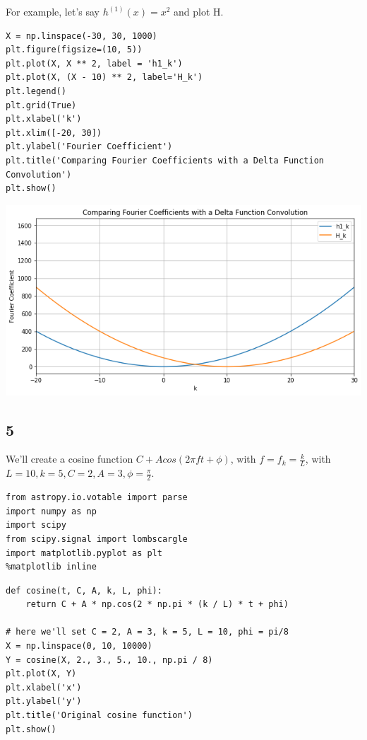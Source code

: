 \documentclass[11pt]{article}
\begin{document}
For example, let's say $h^{(1)}(x) = x^2$ and plot H.

\begin{verbatim}
X = np.linspace(-30, 30, 1000)
plt.figure(figsize=(10, 5))
plt.plot(X, X ** 2, label = 'h1_k')
plt.plot(X, (X - 10) ** 2, label='H_k')
plt.legend()
plt.grid(True)
plt.xlabel('k')
plt.xlim([-20, 30])
plt.ylabel('Fourier Coefficient')
plt.title('Comparing Fourier Coefficients with a Delta Function Convolution')
plt.show()
\end{verbatim}

\includegraphics[width=.9\linewidth]{./obipy-resources/17087KBx.png}


\subsection*{5}
\label{sec-1-5}

We'll create a cosine function $C + A cos(2 \pi f t + \phi)$, with $f = f_k =
\frac{k}{L}$, with $L = 10, k = 5, C = 2, A = 3, \phi = \frac{\pi}{2}$.

\begin{verbatim}
from astropy.io.votable import parse
import numpy as np
import scipy
from scipy.signal import lombscargle
import matplotlib.pyplot as plt
%matplotlib inline
\end{verbatim}


\begin{verbatim}
def cosine(t, C, A, k, L, phi):
    return C + A * np.cos(2 * np.pi * (k / L) * t + phi)

# here we'll set C = 2, A = 3, k = 5, L = 10, phi = pi/8
X = np.linspace(0, 10, 10000)
Y = cosine(X, 2., 3., 5., 10., np.pi / 8)
plt.plot(X, Y)
plt.xlabel('x')
plt.ylabel('y')
plt.title('Original cosine function')
plt.show()
\end{verbatim}
\end{document}
